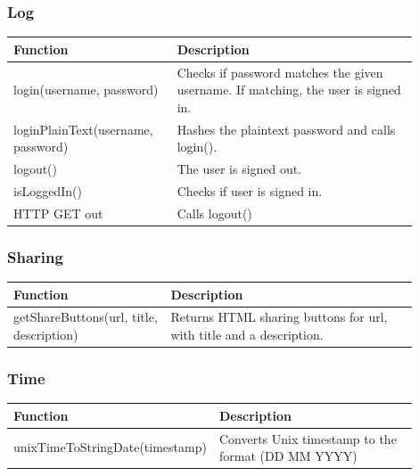 \subsubsection{Log}
\begin{minipage}{\linewidth}
  \centering
  \setlength{\tabcolsep}{12pt}
  \begin{tabular}{|p{0.35\linewidth}|p{0.55\linewidth}|}
  \hline
  \cellcolor{gray!25} Function & \cellcolor{gray!25} Description \\
  \hline
  login(username, password) & Checks if password matches the given username. If matching, the user is signed in. \\
  loginPlainText(username, password) & Hashes the plaintext password and calls login(). \\
  logout() & The user is signed out. \\
  isLoggedIn() & Checks if user is signed in. \\
  HTTP GET out & Calls logout() \\
  \hline
  \end{tabular}
\end{minipage}

\subsubsection{Sharing}
\begin{minipage}{\linewidth}
  \centering
  \setlength{\tabcolsep}{12pt}
  \begin{tabular}{|p{0.35\linewidth}|p{0.55\linewidth}|}
  \hline
  \cellcolor{gray!25} Function & \cellcolor{gray!25} Description \\
  \hline
  getShareButtons(url, title, description) & Returns HTML sharing buttons for url, with title and a description. \\
  \hline
  \end{tabular}
\end{minipage}

\subsubsection{Time}
\begin{minipage}{\linewidth}
  \centering
  \setlength{\tabcolsep}{12pt}
  \begin{tabular}{|p{0.35\linewidth}|p{0.55\linewidth}|}
  \hline
  \cellcolor{gray!25} Function & \cellcolor{gray!25} Description \\
  \hline
  unixTimeToStringDate(timestamp) & Converts Unix timestamp to the format (DD MM YYYY) \\
  \hline
  \end{tabular}
\end{minipage}

